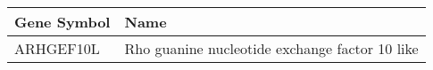 \begin{tabular}{ll}
\toprule
Gene Symbol &                                           Name \\
\midrule
  ARHGEF10L & Rho guanine nucleotide exchange factor 10 like \\
\bottomrule
\end{tabular}
